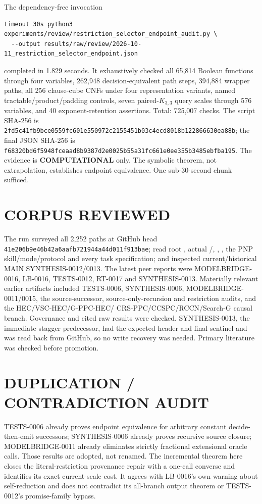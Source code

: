\documentclass[11pt]{article}
\newcommand{\COMP}{\textbf{COMPUTATIONAL}}
\begin{document}
The dependency-free invocation
\begin{verbatim}
timeout 30s python3 experiments/review/restriction_selector_endpoint_audit.py \
  --output results/raw/review/2026-10-11_restriction_selector_endpoint.json
\end{verbatim}
completed in 1.829 seconds.  It exhaustively checked all 65,814 Boolean
functions through four variables, 262,948 decision-equivalent path steps,
394,884 wrapper paths, all 256 clause-cube CNFs under four representation
variants, named tractable/product/padding controls, seven paired-$K_{3,3}$
query scales through 576 variables, and 40 exponent-retention assertions.
Total: 725,007 checks.  The script SHA-256 is
\nolinkurl{2fd5c41fb9bce0559fc601e550972c2155451b03c4ecd8018b122866630ea88b};
the final JSON SHA-256 is
\nolinkurl{f68320bd6f5948fceaad8b9387d2e0025b55a31fc661e0ee355b3485ebfba195}.
The evidence is \COMP{} only.  The symbolic theorem, not extrapolation,
establishes endpoint equivalence.  One sub-30-second chunk sufficed.

\section{CORPUS REVIEWED}

The run surveyed all 2,252 paths at GitHub head
\nolinkurl{41e206b9e46b42a6aafb721944a44d011f913bae}; read root
, actual /,
, , the PNP skill/mode/protocol and every task
specification; and inspected current/historical MAIN SYNTHESIS-0012/0013.
The latest peer reports were MODELBRIDGE-0016, LB-0016, TESTS-0012, RT-0017
and SYNTHESIS-0013.  Materially relevant earlier artifacts included
TESTS-0006, SYNTHESIS-0006, MODELBRIDGE-0011/0015, the source-successor,
source-only-recursion and restriction audits, and the HEC/VSC-HEC/G-PPC-HEC/
CRS-PPC/CCSPC/RCCN/Search-G causal branch.  Governance and cited raw results
were checked.  SYNTHESIS-0013, the immediate stagger predecessor, had the
expected header and final sentinel and was read back from GitHub, so no write
recovery was needed.  Primary literature was checked before promotion.

\section{DUPLICATION / CONTRADICTION AUDIT}

TESTS-0006 already proves endpoint equivalence for arbitrary constant
decide-then-emit successors; SYNTHESIS-0006 already proves recursive source
closure; MODELBRIDGE-0011 already eliminates strictly fractional extensional
oracle calls.  Those results are adopted, not renamed.  The incremental
theorem here closes the literal-restriction provenance repair with a one-call
converse and identifies its exact current-scale cost.  It agrees with
LB-0016's own warning about self-reduction and does not contradict its
all-branch output theorem or TESTS-0012's promise-family bypass.
\end{document}
